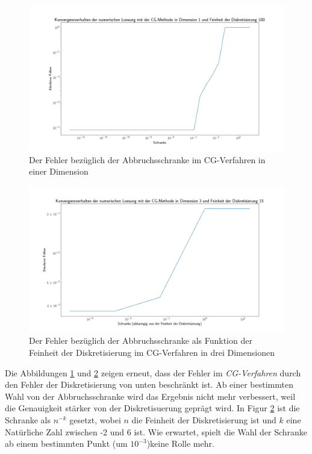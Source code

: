 \documentclass[smallheadings]{scrartcl}
\numberwithin{equation}{section}
\begin{document}
 \begin{figure}[H]
 	\centering
 	\includegraphics[width=\linewidth]{Bilder/SchranekDim1}
 	\caption{Der Fehler bezüglich der Abbruchsschranke im CG-Verfahren in einer Dimension}
 	\label{fig:schrankedim1}
 \end{figure}

 \begin{figure}[H]
 	\centering
 	\includegraphics[width=\linewidth]{Bilder/loglogdim3}
 	\caption{Der Fehler bezüglich der Abbruchsschranke als Funktion der Feinheit der Diskretisierung im CG-Verfahren in drei Dimensionen}
 	\label{fig:loglog3}
 \end{figure}

Die Abbildungen \ref{fig:schrankedim1} und \ref{fig:loglog3} zeigen erneut, dass der Fehler im \textit{CG-Verfahren} durch den Fehler der Diskretisierung von unten beschränkt ist. Ab einer bestimmten Wahl von der Abbruchsschranke wird das Ergebnis nicht mehr verbessert, weil die Genauigkeit stärker von der Diskretisuerung geprägt wird. In Figur \ref{fig:loglog3} ist die Schranke als $n^{-k}$ gesetzt, wobei $n$ die Feinheit der Diskretisierung ist und $k$ eine Natürliche Zahl zwischen -2 und 6 ist. Wie erwartet, spielt die Wahl der Schranke ab einem bestimmten Punkt (um $10^{-3}$)keine Rolle mehr.
\end{document}
